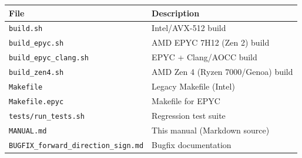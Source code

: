 \documentclass[11pt,a4paper]{article}
\begin{document}
\begin{tabular}{ll}
\toprule
File & Description \\
\midrule
\texttt{build.sh}             & Intel/AVX-512 build \\
\texttt{build\_epyc.sh}       & AMD EPYC 7H12 (Zen 2) build \\
\texttt{build\_epyc\_clang.sh} & EPYC + Clang/AOCC build \\
\texttt{build\_zen4.sh}        & AMD Zen 4 (Ryzen 7000/Genoa) build \\
\texttt{Makefile}              & Legacy Makefile (Intel) \\
\texttt{Makefile.epyc}         & Makefile for EPYC \\
\texttt{tests/run\_tests.sh}   & Regression test suite \\
\texttt{MANUAL.md}             & This manual (Markdown source) \\
\texttt{BUGFIX\_forward\_direction\_sign.md} & Bugfix documentation \\
\bottomrule
\end{tabular}
\end{document}
